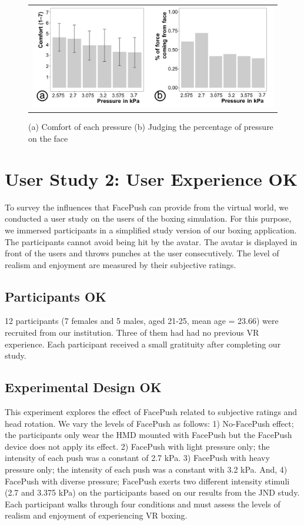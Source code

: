 \begin{figure}[h]
    \begin{center}
        \begin{tabular}{@{\hspace{0.1cm}}c}
           \includegraphics[width=1\linewidth]{figures/comfort}
        \end{tabular}
        \caption{(a) Comfort of each pressure (b) Judging the percentage of pressure on the face}
\label{fig:comfort}
    \end{center}
\end{figure}

\section{User Study 2: User Experience OK}
To survey the influences that FacePush can provide from the virtual world, we conducted a user study on the users of the boxing simulation. For this purpose, we immersed participants in a simplified study version of our boxing application. The participants cannot avoid being hit by the avatar. The avatar is displayed in front of the users and throws punches at the user consecutively. The level of realism and enjoyment are measured by their subjective ratings.

\subsection{Participants OK}
12 participants (7 females and 5 males, aged 21-25, mean age = 23.66) were recruited from our institution. Three of them had had no previous VR experience. Each participant received a small gratituity after completing our study.

\subsection{Experimental Design OK}
This experiment explores the effect of FacePush related to subjective ratings and head rotation. We vary the levels of FacePush as follows: 1) No-FacePush effect; the participants only wear the HMD mounted with FacePush but the FacePush device does not apply its effect. 2) FacePush with light pressure only; the intensity of each push was a constant of 2.7 kPa. 3) FacePush with heavy pressure only; the intensity of each push was a constant with 3.2 kPa. And, 4) FacePush with diverse pressure; FacePush exerts two different intensity stimuli (2.7 and 3.375 kPa) on the participants based on our results from the JND study. Each participant walks through four conditions and must assess the levels of realism and enjoyment of experiencing VR boxing.

